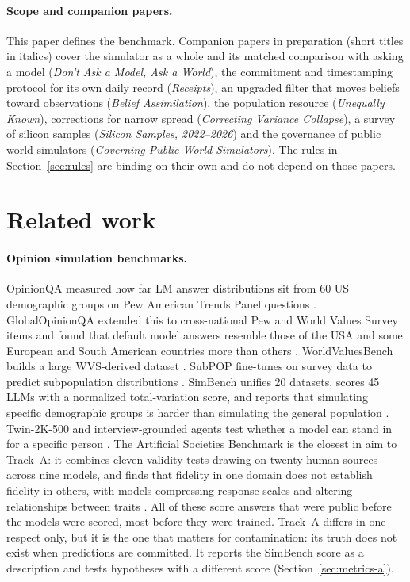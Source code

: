 \documentclass[11pt]{article}
\begin{document}
\paragraph{Scope and companion papers.} This paper defines the benchmark. Companion papers in preparation (short titles in italics) cover the simulator as a whole and its matched comparison with asking a model (\emph{Don't Ask a Model, Ask a World}), the commitment and timestamping protocol for its own daily record (\emph{Receipts}), an upgraded filter that moves beliefs toward observations (\emph{Belief Assimilation}), the population resource (\emph{Unequally Known}), corrections for narrow spread (\emph{Correcting Variance Collapse}), a survey of silicon samples (\emph{Silicon Samples, 2022--2026}) and the governance of public world simulators (\emph{Governing Public World Simulators}). The rules in Section~\ref{sec:rules} are binding on their own and do not depend on those papers.

\section{Related work}

\paragraph{Opinion simulation benchmarks.} OpinionQA measured how far LM answer distributions sit from 60 US demographic groups on Pew American Trends Panel questions \citep{santurkar2023whose}. GlobalOpinionQA extended this to cross-national Pew and World Values Survey items and found that default model answers resemble those of the USA and some European and South American countries more than others \citep{durmus2023global}. WorldValuesBench builds a large WVS-derived dataset \citep{zhao2024worldvaluesbench}. SubPOP fine-tunes on survey data to predict subpopulation distributions \citep{suh2025subpop}. SimBench unifies 20 datasets, scores 45 LLMs with a normalized total-variation score, and reports that simulating specific demographic groups is harder than simulating the general population \citep{hu2026simbench}. Twin-2K-500 and interview-grounded agents test whether a model can stand in for a specific person \citep{toubia2025twin,park2024agents}. The Artificial Societies Benchmark is the closest in aim to Track~A: it combines eleven validity tests drawing on twenty human sources across nine models, and finds that fidelity in one domain does not establish fidelity in others, with models compressing response scales and altering relationships between traits \citep{chidichimo2026artificial}. All of these score answers that were public before the models were scored, most before they were trained. Track~A differs in one respect only, but it is the one that matters for contamination: its truth does not exist when predictions are committed. It reports the SimBench score as a description and tests hypotheses with a different score (Section~\ref{sec:metrics-a}).
\end{document}
